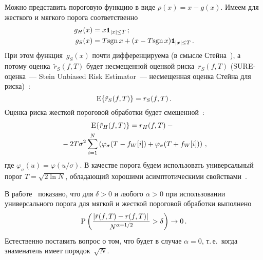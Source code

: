 \begin{multicols}{2}
Можно представить пороговую функцию в виде $\rho(x)=x-g(x)$. Имеем для жесткого и мягкого порога соответственно
\begin{align*}
g_H(x)&=x\mbox{{\small \tt {1}}\hspace{-1.5mm}{\tt 1}}_{|x|\leq T}\,;\\
g_S(x)&=T\textrm{sgn}\,x+(x-T\textrm{sgn}\, x)\mbox{{\small \tt {1}}\hspace{-1.5mm}{\tt 1}}_{|x|\leq T}\,.
\end{align*}
При этом функция~$g_S(x)$ почти дифференци\-ру\-ема (в смысле Стейна~\cite{6mar}), 
а потому оценка~$\tilde{r}_S(f,T)$ будет несмещенной оценкой риска~$r_S(f,T)$ (SURE-оценка~--- Stein
Unbiased Risk Estimator~--- несмещенная оценка Стейна для риска)~\cite{3mar, 5mar}:
\begin{equation*}
\textrm{E}\{\tilde{r}_S(f,T)\}=r_S(f,T)\,.
\end{equation*}
Оценка риска жесткой пороговой обработки будет смещенной~\cite{3mar}:
\begin{multline*}
\!\!\textrm{E}\{\tilde{r}_H(f,T)\}=r_H(f,T)-{}\\
{}-2T\sigma^2\sum_{i=1}^N
\left(\varphi_\sigma(T-f_W[i])+\varphi_\sigma(T+f_W[i])\right)\,,
\end{multline*}
где $\varphi_\sigma(u)=\varphi\left(u/\sigma\right)$.
В качестве порога будем использовать универсальный порог $T =\sqrt{2 \ln N}$, 
обла\-да\-ющий хорошими асимптотическими свойствами~\cite{2mar}.

В работе~\cite{1mar} показано, что для $\delta>0$ и любого $\alpha>0$ 
при использовании универсального порога для мягкой и жесткой пороговой обработки выполнено
\begin{equation*}
\textrm{P}\left(\displaystyle\frac{\displaystyle \left|\tilde{r}(f,T)-r(f,T)\right|\mathstrut}{\displaystyle N^{\alpha+1/2}\mathstrut}>\delta\right)\rightarrow 0\,.
\end{equation*}
Естественно поставить вопрос о том, что будет в случае $\alpha=0$, т.\,е.\ когда знаменатель имеет порядок~$\sqrt{N}$.


\end{multicols}
